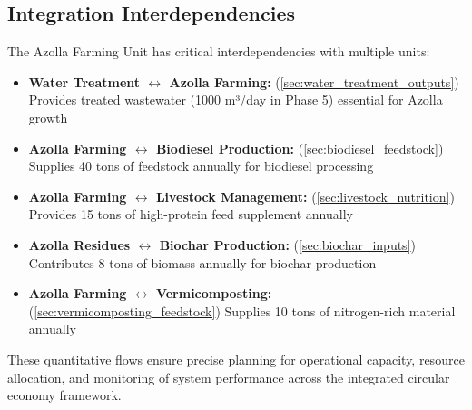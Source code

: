 \subsection{Integration Interdependencies}
The Azolla Farming Unit has critical interdependencies with multiple units:

\begin{itemize}
    \item \textbf{Water Treatment $\leftrightarrow$ Azolla Farming:} (\ref{sec:water_treatment_outputs}) Provides treated wastewater (1000 m³/day in Phase 5) essential for Azolla growth
    
    \item \textbf{Azolla Farming $\leftrightarrow$ Biodiesel Production:} (\ref{sec:biodiesel_feedstock}) Supplies 40 tons of feedstock annually for biodiesel processing
    
    \item \textbf{Azolla Farming $\leftrightarrow$ Livestock Management:} (\ref{sec:livestock_nutrition}) Provides 15 tons of high-protein feed supplement annually
    
    \item \textbf{Azolla Residues $\leftrightarrow$ Biochar Production:} (\ref{sec:biochar_inputs}) Contributes 8 tons of biomass annually for biochar production
    
    \item \textbf{Azolla Farming $\leftrightarrow$ Vermicomposting:} (\ref{sec:vermicomposting_feedstock}) Supplies 10 tons of nitrogen-rich material annually
\end{itemize}

These quantitative flows ensure precise planning for operational capacity, resource allocation, and monitoring of system performance across the integrated circular economy framework.
